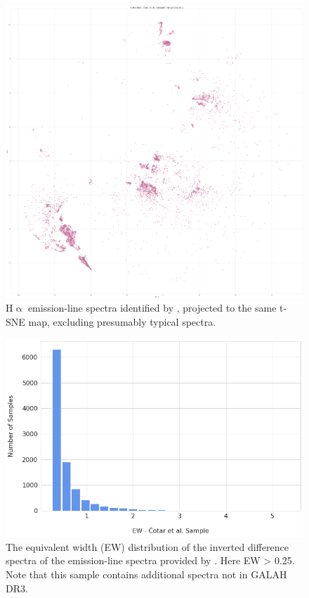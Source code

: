 \begin{figure}[!htb]
\centering
\includegraphics[scale=0.10]{figures/tsne_cotar_only.png}
\caption{H$\upalpha$ emission-line spectra identified by \citet{vcotar2021galah}, projected to the same t-SNE map, excluding presumably typical spectra.}
\end{figure}

\begin{figure}[!htb]
\centering
\includegraphics[scale=0.50]{figures/EW hist cotar.png}
\caption{The equivalent width (EW) distribution of the inverted difference spectra of the emission-line spectra provided by \citet{vcotar2021galah}. Here EW > 0.25. Note that this sample contains additional spectra not in GALAH DR3.}
\end{figure}

